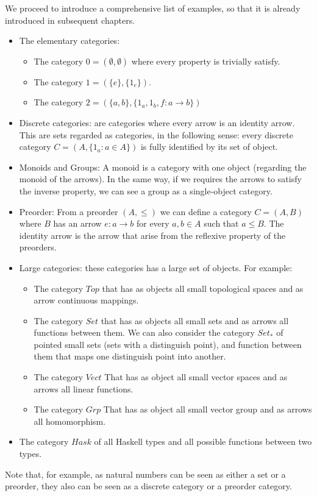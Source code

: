 We proceed to introduce a comprehensive list of examples, so that it is already introduced in subsequent chapters. 
\begin{example}

  \begin{itemize}  \ 
\item The elementary categories:
  \begin{itemize}
  \item The category $0 = ( \emptyset, \emptyset)$ where every property is trivially satisfy.
  \item The category $1 = (\{e\},\{1_e\})$.
  \item The category $2 = (\{a,b\},\{1_a,1_b,f:a\to b\})$
  \end{itemize}

\item Discrete categories: are categories where every arrow is an identity arrow. This are sets regarded as categories, in the following sense: every discrete category $C=(A, \{1_a : a \in A\})$ is fully identified by its set of object.  
\item Monoids and Groups: A monoid is a category with one object (regarding the monoid of the arrows). In the same way, if we requires the arrows to satisfy the inverse property, we can see a group as a single-object category. 
\item Preorder: From a preorder $(A, \le)$ we can define a category $C = (A, B)$ where $B$ has an arrow $e: a \to b$ for every $a,b\in A$ such that $a \le B$. The identity arrow is the arrow that arise from the reflexive property of the preorders. 

\item Large categories: these categories has a large set of objects. For example:
  \begin{itemize}
\item The category $Top$ that has as objects all small topological spaces and as arrow continuous mappings.
\item The category $Set$ that has as objects all small sets and as arrows all functions between them. We can also consider the category $Set_*$ of pointed small sets (sets with a distinguish point), and function between them that maps one distinguish point into another.  
\item The category $Vect$ That has as object all small vector spaces and as arrows all linear functions.
\item The category $Grp$ That has as object all small vector group and as arrows all homomorphism.
\end{itemize}

\item The category $Hask$ of all Haskell types and all possible functions between two types.
\end{itemize}
Note that, for example, as natural numbers can be seen as either a set or a preorder, they also can be seen as a discrete category or a preorder category.
\end{example}






